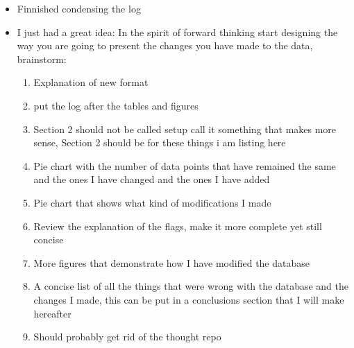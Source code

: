 \documentclass[12pt]{article}
\begin{document}
\begin{itemize}
    \item Finnished condensing the log
    \item I just had a great idea: In the spirit of forward thinking start designing the way you are going to present the changes you have made to the data, brainstorm:
    \begin{enumerate}
        \item Explanation of new format
        \item put the log after the tables and figures
        \item Section 2 should not be called setup call it something that makes more sense, Section 2 should be for these things i am listing here
        \item Pie chart with the number of data points that have remained the same and the ones I have changed and the ones I have added
        \item Pie chart that shows what kind of modifications I made
        \item Review the explanation of the flags, make it more complete yet still concise
        \item More figures that demonstrate how I have modified the database
        \item A concise list of all the things that were wrong with the database and the changes I made, this can be put in a conclusions section that I will make hereafter
        \item Should probably get rid of the thought repo
    \end{enumerate}
\end{itemize}
\end{document}
